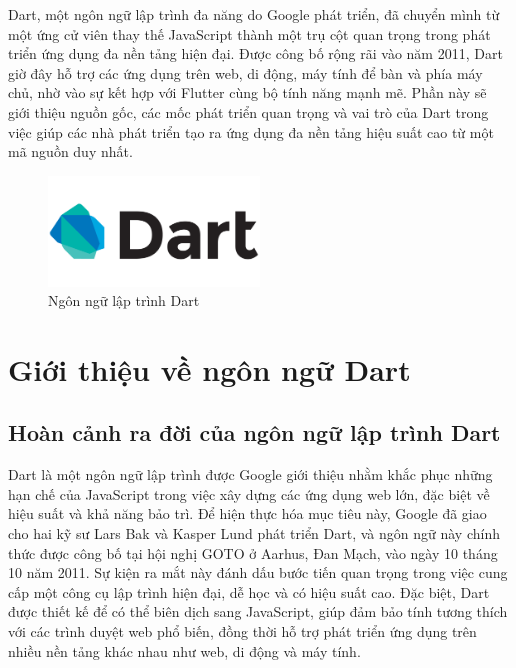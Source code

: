 \documentclass[../DoAn.tex]{subfiles}
\numberwithin{figure}{chapter}
\begin{document}
Dart, một ngôn ngữ lập trình đa năng do Google phát triển, đã chuyển mình từ một ứng cử viên thay thế JavaScript thành một trụ cột quan trọng trong phát triển ứng dụng đa nền tảng hiện đại. Được công bố rộng rãi vào năm 2011, Dart giờ đây hỗ trợ các ứng dụng trên web, di động, máy tính để bàn và phía máy chủ, nhờ vào sự kết hợp với Flutter cùng bộ tính năng mạnh mẽ. Phần này sẽ giới thiệu nguồn gốc, các mốc phát triển quan trọng và vai trò của Dart trong việc giúp các nhà phát triển tạo ra ứng dụng đa nền tảng hiệu suất cao từ một mã nguồn duy nhất.

\begin{figure}[H]
    \centering
    \includegraphics[width=0.5\textwidth]{Hinhve/dartimg.png}
    \caption{Ngôn ngữ lập trình Dart}
    \label{fig:dartimg}
\end{figure}

\section{Giới thiệu về ngôn ngữ Dart}
\subsection{Hoàn cảnh ra đời của ngôn ngữ lập trình Dart}

Dart là một ngôn ngữ lập trình được Google giới thiệu nhằm khắc phục những hạn chế của JavaScript trong việc xây dựng các ứng dụng web lớn, đặc biệt về hiệu suất và khả năng bảo trì. Để hiện thực hóa mục tiêu này, Google đã giao cho hai kỹ sư Lars Bak và Kasper Lund phát triển Dart, và ngôn ngữ này chính thức được công bố tại hội nghị GOTO ở Aarhus, Đan Mạch, vào ngày 10 tháng 10 năm 2011. Sự kiện ra mắt này đánh dấu bước tiến quan trọng trong việc cung cấp một công cụ lập trình hiện đại, dễ học và có hiệu suất cao. Đặc biệt, Dart được thiết kế để có thể biên dịch sang JavaScript, giúp đảm bảo tính tương thích với các trình duyệt web phổ biến, đồng thời hỗ trợ phát triển ứng dụng trên nhiều nền tảng khác nhau như web, di động và máy tính.
\end{document}
